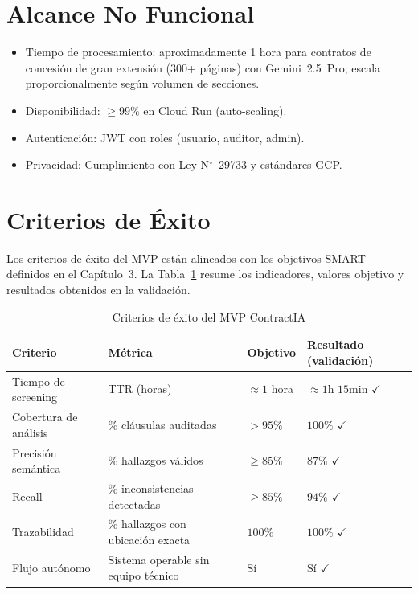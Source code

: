 \section{Alcance No Funcional}

\begin{itemize}
    \item Tiempo de procesamiento: aproximadamente 1 hora para contratos
    de concesión de gran extensión (300+ páginas) con Gemini~2.5~Pro;
    escala proporcionalmente según volumen de secciones.
    \item Disponibilidad: $\geq 99\%$ en Cloud Run (auto-scaling).
    \item Autenticación: JWT con roles (usuario, auditor, admin).
    \item Privacidad: Cumplimiento con Ley N$^\circ$~29733 y estándares GCP.
\end{itemize}

\section{Criterios de Éxito}

Los criterios de éxito del MVP están alineados con los objetivos SMART
definidos en el Capítulo~3. La Tabla~\ref{tab:criterios_exito} resume
los indicadores, valores objetivo y resultados obtenidos en la validación.

\begin{table}[H]
\centering
\caption{Criterios de éxito del MVP ContractIA}
\label{tab:criterios_exito}
\begin{tabular}{p{4cm} p{3cm} p{3cm} p{3.5cm}}
\toprule
\textbf{Criterio} & \textbf{Métrica} & \textbf{Objetivo} &
\textbf{Resultado (validación)} \\
\midrule
Tiempo de screening & TTR (horas) & $\approx 1$ hora &
  $\approx 1$h $15$min $\checkmark$ \\[4pt]
Cobertura de análisis & \% cláusulas auditadas & $> 95\%$ &
  $100\%$ $\checkmark$ \\[4pt]
Precisión semántica & \% hallazgos válidos & $\geq 85\%$ &
  $87\%$ $\checkmark$ \\[4pt]
Recall & \% inconsistencias detectadas & $\geq 85\%$ &
  $94\%$ $\checkmark$ \\[4pt]
Trazabilidad & \% hallazgos con ubicación exacta & $100\%$ &
  $100\%$ $\checkmark$ \\[4pt]
Flujo autónomo & Sistema operable sin equipo técnico & Sí &
  Sí $\checkmark$ \\
\bottomrule
\end{tabular}
\end{table}

